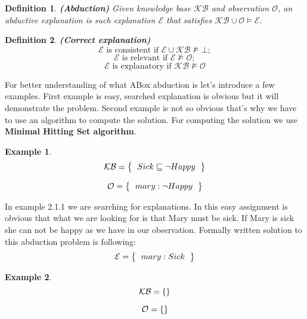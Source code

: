 \documentclass[12pt,a4paper]{article}
\newtheorem{definition}{Definition}[subsection]
\newtheorem{example}{Example}[subsection]
\begin{document}
\begin{definition}{\textbf{(Abduction)}} 
	Given knowledge base $\mathcal{KB}$ and observation $\mathcal{O}$, an abductive explanation is such explanation $\mathcal{E}$ that satisfies $\mathcal{KB} \cup \mathcal{O} \models \mathcal{E}$.
\end{definition}

\begin{definition}{\textbf{(Correct explanation)}}
	\[ \mathcal{E} \text{ is consistent if } \mathcal{E} \cup \mathcal{KB} \not \models \mathcal{\bot}; \] 
	\[ \mathcal{E} \text{ is relevant if } \mathcal{E} \not \models \mathcal{O}; \]
	\[ \mathcal{E} \text{ is explanatory if } \mathcal{KB} \not \models \mathcal{O} \]
\end{definition}

For better understanding of what ABox abduction is let's introduce a few examples. First example is easy, searched explanation is obvious but it will demonstrate the problem. Second example is not so obvious that's why we have to use an algorithm to compute the solution. For computing the solution we use \textbf{Minimal Hitting Set algorithm}. 

\begin{example}	
	\[ 
	\mathcal{KB} = \left\{
	\begin{tabular}{l c}
	$Sick \sqsubseteq \neg Happy$
	\end{tabular}
	\right \}
	\]
	
	\[ 
	\mathcal{O} = \left\{
	\begin{tabular}{l c}
	$mary : \neg Happy$
	\end{tabular}
	\right \}
	\]								
\end{example}

In example 2.1.1 we are searching for explanations. In this easy assignment is obvious that what we are looking for is that Mary must be sick. If Mary is sick she can not be happy as we have in our observation. Formally written solution to this abduction problem is following:
\[ 
\mathcal{E} = \left\{
\begin{tabular}{l c}
$mary : Sick$
\end{tabular}
\right \}
\]

\begin{example}
	\[ 
	\mathcal{KB} = \left\{
	\begin{tabular}{l c}
	\end{tabular}
	\right \}
	\]
	
	\[ 
	\mathcal{O} = \left\{
	\begin{tabular}{l c}
	\end{tabular}
	\right \}
	\]								
	
\end{example}
\end{document}
